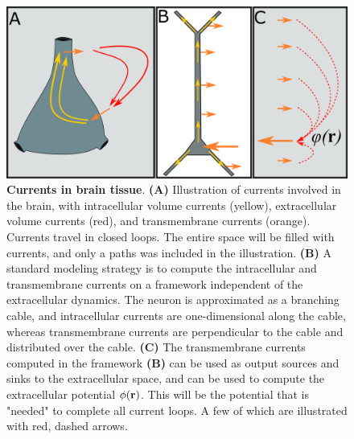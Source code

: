 \begin{figure}[!ht]
\begin{center}
\includegraphics[width=1.0\textwidth]{Figures/Basics/Twostep.png}
\end{center}
\caption{{\bf Currents in brain tissue}. {\bf(A)} Illustration of currents involved in the brain, with intracellular volume currents (yellow), extracellular volume currents (red), and transmembrane currents (orange). Currents travel in closed loops. The entire space will be filled with currents, and only a paths was included in the illustration. {\bf(B)} A standard modeling strategy is to compute the intracellular and transmembrane currents on a framework independent of the extracellular dynamics. The neuron is approximated as a branching cable, and intracellular currents are one-dimensional along the cable, whereas transmembrane currents are perpendicular to the cable and distributed over the cable. {\bf(C)} The transmembrane currents computed in the framework {\bf(B)} can be used as output sources and sinks to the extracellular space, and can be used to compute the extracellular potential $\phi({\bf r})$. This will be the potential that is "needed" to complete all current loops. A few of which are illustrated with red, dashed arrows. 
}
\label{fig:Basics:Twostep}
\end{figure}


